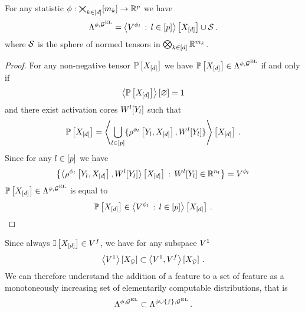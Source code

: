 \begin{lemma}
    For any statistic $\phi:\bigtimes_{k\in[d]}[m_{k}]\rightarrow\mathbb{R}^{p}$ we have
    \begin{align*}
        \Lambda^{\phi,\mathcal{G}^{\mathrm{EL}}} = \left\langle V^{\phi_{l}} \, : \, l\in[p]\right\rangle \left[ X_{[d]} \right]  \cup \mathcal{S} \, .
    \end{align*}
    where $\mathcal{S}$ is the sphere of normed tensors in $\bigotimes_{k\in[d]} \mathbb{R}^{m_{k}}$.
\end{lemma}
\begin{proof}
    For any non-negative tensor $\mathbb{P}\left[X_{[d]}\right]$ we have $\mathbb{P}\left[X_{[d]}\right]\in\Lambda^{\phi,\mathcal{G}^{\mathrm{EL}}}$ if and only if
    \begin{align*}
        \left\langle \mathbb{P}\left[X_{[d]}\right]\right\rangle \left[ \varnothing \right]=1
    \end{align*}
    and there exist activation cores $W^{l}[Y_{l}]$ such that
    \begin{align*}
        \mathbb{P}\left[X_{[d]}\right]
        = \left\langle \bigcup_{l\in[p]}\{\rho^{\phi_{l}}\left[Y_{l},X_{[d]}\right],W^{l}[Y_{l}]\}\right\rangle \left[ X_{[d]} \right] \, .
    \end{align*}
    Since for any $l\in[p]$ we have
    \begin{align*}
        \left\{\left\langle \rho^{\phi_{l}}\left[Y_{l},X_{[d]}\right],W^{l}[Y_{l}]\right\rangle \left[ X_{[d]} \right] \,:\,
        W^{l}[Y_{l}] \in \mathbb{R}^{n_{l}}
        \right\} = V^{\phi_{l}}
    \end{align*}
    $\mathbb{P}\left[X_{[d]}\right]\in\Lambda^{\phi,\mathcal{G}^{\mathrm{EL}}}$ is equal to
    \begin{align*}
        \mathbb{P}\left[X_{[d]}\right] \in \left\langle V^{\phi_{l}}\,:\,l\in[p]\right\rangle \left[ X_{[d]} \right] \, .
    \end{align*}
\end{proof}


Since always $\mathbb{I}\left[X_{[d]}\right]\in V^{f}$, we have for any subspace $V^{1}$
\begin{align*}
    \left\langle V^{1}\right\rangle \left[ X_{\tilde{\mathcal{V}}} \right]
    \subset \left\langle V^{1},V^{f}\right\rangle \left[ X_{\tilde{\mathcal{V}}} \right] \, .
\end{align*}
We can therefore understand the addition of a feature to a set of feature as a monotoneously increasing set of elementarily computable distributions, that is
\begin{align*}
    \Lambda^{\phi,\mathcal{G}^{\mathrm{EL}}} \subset \Lambda^{\phi\cup\{f\},\mathcal{G}^{\mathrm{EL}}} \, .
\end{align*}


